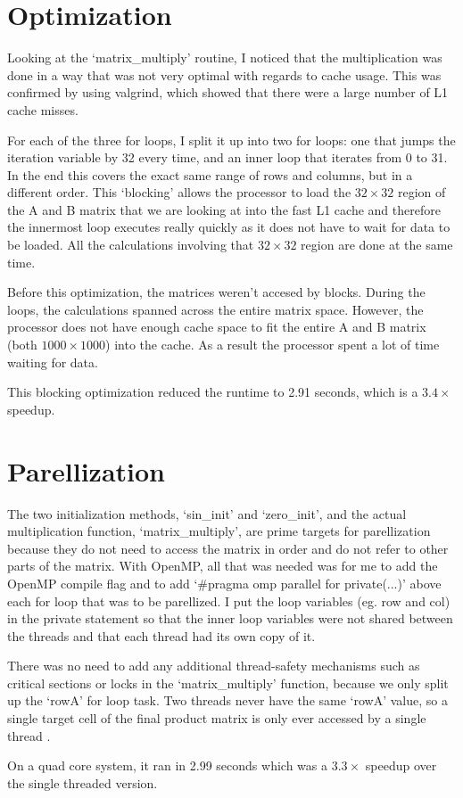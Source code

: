 \documentclass[12pt]{article}
\begin{document}
\section{Optimization}
Looking at the `matrix\_multiply' routine, I noticed that the multiplication was done in a way that was not very optimal with regards to cache usage. This was confirmed by using valgrind, which showed that there were a large number of L1 cache misses.

For each of the three for loops, I split it up into two for loops: one that jumps the iteration variable by 32 every time, and an inner loop that iterates from 0 to 31. In the end this covers the exact same range of rows and columns, but in a different order. This `blocking' allows the processor to load the $32\times 32$ region of the A and B matrix that we are looking at into the fast L1 cache and therefore the innermost loop executes really quickly as it does not have to wait for data to be loaded. All the calculations involving that $32\times 32$ region are done at the same time.

Before this optimization, the matrices weren't accesed by blocks. During the loops, the calculations spanned across the entire matrix space. However, the processor does not have enough cache space to fit the entire A and B matrix (both $1000 \times 1000$) into the cache. As a result the processor spent a lot of time waiting for data.

This blocking optimization reduced the runtime to 2.91 seconds, which is a $3.4 \times$ speedup.

\section{Parellization}
The two initialization methods, `sin\_init' and `zero\_init', and the actual multiplication function, `matrix\_multiply', are prime targets for parellization because they do not need to access the matrix in order and do not refer to other parts of the matrix. With OpenMP, all that was needed was for me to add the OpenMP compile flag and to add `\#pragma omp parallel for private(...)' above each for loop that was to be parellized. I put the loop variables (eg. row and col) in the private statement so that the inner loop variables were not shared between the threads and that each thread had its own copy of it.

There was no need to add any additional thread-safety mechanisms such as critical sections or locks in the `matrix\_multiply' function, because we only split up the `rowA' for loop task. Two threads never have the same `rowA' value, so a single target cell of the final product matrix is only ever accessed by a single thread .

On a quad core system, it ran in 2.99 seconds which was a $3.3\times$ speedup over the single threaded version.
\end{document}
